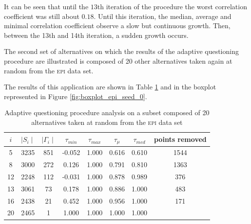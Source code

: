 It can be seen that until the $13$th iteration of the procedure the worst correlation coefficient was still about $0.18$.
Until this iteration, the median, average and minimal correlation coefficient observe a slow but continuous growth. Then, between the 13th and 14th iteration, a sudden growth occurs.

\newpage
The second set of alternatives on which the results of the adaptive questioning procedure are illustrated is composed of 20 other alternatives taken again at random from the \textsc{epi} data set.

The results of this application are shown in Table \ref{tbl:questioning_procedure_EPI_0} and in the boxplot  represented in Figure \ref{fig:boxplot_epi_seed_0}.

\begin{table}[!h]
    \centering
    \begin{tabular}{c c           c             c                    c               c            c          c}
        \toprule
        $i$  & $\mid S_i \mid$ & $\mid \Gamma_i \mid$ & $\tau_{min} $   & $\tau_{max}$ & $\tau_{\mu}$& $\tau_{med}$  & points removed  \\
         \midrule

 5 &  3235   &  851  &-0.052 & 1.000 & 0.616 & 0.610 &  1544\\   
 8 &  3000   &  272  & 0.126 & 1.000 & 0.791 & 0.810 &  1363 \\  
12 &  2248   &  112  &-0.031 & 1.000 & 0.878 & 0.989 &   376  \\ 
13 &  3061   &  73   & 0.178 & 1.000 & 0.886 & 1.000 &   483  \\ 
16 &  2438   &  21   & 0.452 & 1.000 & 0.956 & 1.000 &   171  \\ 
20 &  2465   &   1   & 1.000 & 1.000 & 1.000 & 1.000 &     \\ 
        \bottomrule
    \end{tabular}
    \caption{Adaptive questioning procedure analysis on a subset composed of 20 alternatives taken at random from the \textsc{epi} data set}
    \label{tbl:questioning_procedure_EPI_0}
\end{table}

